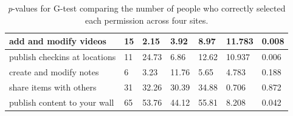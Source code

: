 \documentclass[10pt]{sig-alternate-10pt}
\begin{document}
\begin{table}[htpb]
\begin{tabular}{|l|l|l|l|l|l|l|}
    add and modify videos                & 15                                                          & 2.15                                                            & 3.92                                                         & 8.97                                                       & 11.783                                                                               & 0.008                             \\ \hline
    publish checkins at locations        & 11                                                          & 24.73                                                           & 6.86                                                         & 12.62                                                      & 10.937                                                                               & 0.006                             \\ \hline
    create and modify notes              & 6                                                           & 3.23                                                            & 11.76                                                        & 5.65                                                       & 4.783                                                                                & 0.188                             \\ \hline
    share items with others              & 31                                                          & 32.26                                                           & 30.39                                                        & 34.88                                                      & 0.706                                                                                & 0.872                             \\ \hline
    publish content to your wall         & 65                                                          & 53.76                                                           & 44.12                                                        & 55.81                                                      &    8.208                                                                                  & 0.042                             \\ \hline
  \end{tabular}
  \caption{\emph{p}-values for G-test comparing the number of people who correctly selected each permission across four sites.}
  \label{table:multistats}
\end{table}
\end{document}
